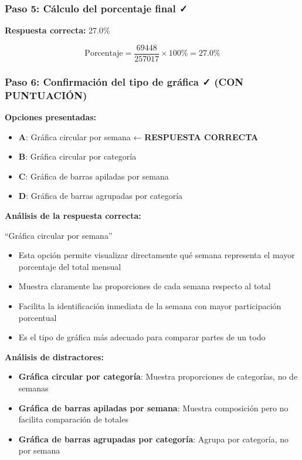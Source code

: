 \documentclass[
]{article}
\providecommand{\tightlist}{%
  \setlength{\itemsep}{0pt}\setlength{\parskip}{0pt}}
\begin{document}
\subsubsection{Paso 5: Cálculo del porcentaje final
✓}\label{paso-5-cuxe1lculo-del-porcentaje-final-1}

\textbf{Respuesta correcta:} 27.0\%

\[\text{Porcentaje} = \frac{69448}{257017} \times 100\% = 27.0\%\]

\subsubsection{Paso 6: Confirmación del tipo de gráfica ✓ (CON
PUNTUACIÓN)}\label{paso-6-confirmaciuxf3n-del-tipo-de-gruxe1fica-con-puntuaciuxf3n-1}

\textbf{Opciones presentadas:}

\begin{itemize}
\tightlist
\item
  \textbf{A}: Gráfica circular por semana ← \textbf{RESPUESTA CORRECTA}
\item
  \textbf{B}: Gráfica circular por categoría
\item
  \textbf{C}: Gráfica de barras apiladas por semana
\item
  \textbf{D}: Gráfica de barras agrupadas por categoría
\end{itemize}

\textbf{Análisis de la respuesta correcta:}

``Gráfica circular por semana''

\begin{itemize}
\tightlist
\item
  Esta opción permite visualizar directamente qué semana representa el
  mayor porcentaje del total mensual
\item
  Muestra claramente las proporciones de cada semana respecto al total
\item
  Facilita la identificación inmediata de la semana con mayor
  participación porcentual
\item
  Es el tipo de gráfica más adecuado para comparar partes de un todo
\end{itemize}

\textbf{Análisis de distractores:}

\begin{itemize}
\tightlist
\item
  \textbf{Gráfica circular por categoría}: Muestra proporciones de
  categorías, no de semanas
\item
  \textbf{Gráfica de barras apiladas por semana}: Muestra composición
  pero no facilita comparación de totales
\item
  \textbf{Gráfica de barras agrupadas por categoría}: Agrupa por
  categoría, no por semana
\end{itemize}
\end{document}

